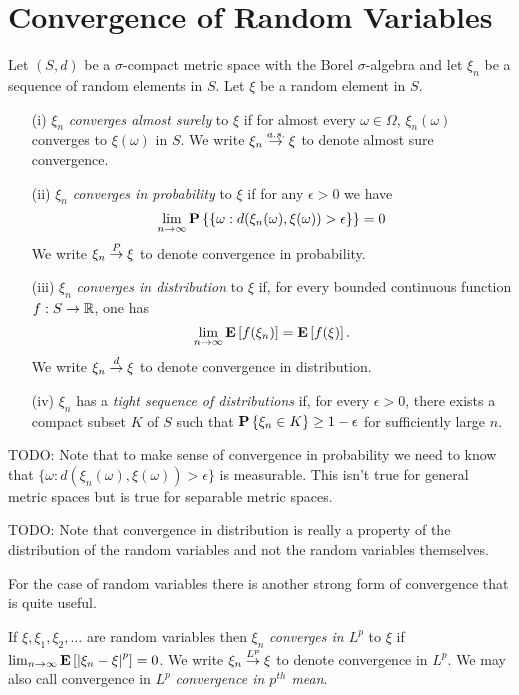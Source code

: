 \chapter{Convergence of Random Variables}
\begin{defn}Let $(S,d)$ be a $\sigma$-compact metric space with the Borel
  $\sigma$-algebra and let $\xi_n$ be a sequence of random elements in
  $S$.  Let $\xi$ be a random element in $S$.
\begin{itemize}
\item[(i)] $\xi_n$ \emph{converges almost surely} to $\xi$ if for almost
  every $\omega \in \Omega$, $\xi_n(\omega)$ converges to $\xi(\omega)$ in $S$.
We write $\xi_n \overset{a.s.}\to \xi$ to denote almost sure convergence.
\item[(ii)] $\xi_n$ \emph{converges in probability} to $\xi$ if for any
  $\epsilon>0$ we have 
\begin{equation*}
\lim_{n \to \infty} \textbf{P}\left \{ \lbrace \omega : d(\xi_n(\omega),
      \xi(\omega)) >
      \epsilon \rbrace  \right \} = 0
\end{equation*}
We write $\xi_n \overset{P}\to \xi$ to denote convergence in probability.
\item[(iii)] $\xi_n$ \emph{converges in distribution} to $\xi$ if, for
  every bounded continuous function $f:S \to \mathbb{R}$, one has 
\begin{equation*}
\lim_{n \to \infty} \textbf{E}\left[f(\xi_n)\right] = \textbf{E}\left[f(\xi)\right].
\end{equation*} 
We write $\xi_n \overset{d}\to \xi$ to denote convergence in distribution.
\item[(iv)] $\xi_n$ has a \emph{tight sequence of distributions} if, for
  every $\epsilon>0$, there exists a compact subset $K$ of $S$ such
  that $\textbf{P}\left \{\xi_n \in K \right \} \geq 1 - \epsilon$ for sufficiently
  large $n$.
\end{itemize}
\end{defn}

TODO: Note that to make sense of convergence in probability we need to know that $\lbrace \omega : d(\xi_n(\omega), \xi(\omega)) > \epsilon \rbrace$ 
is measurable.  This isn't true for general metric spaces but is true for separable metric spaces.

TODO: Note that convergence in distribution is really a property of
the distribution of the random variables and not the random variables
themselves.

For the case of random variables there is another strong form of
convergence that is quite useful.
\begin{defn}If $\xi, \xi_1, \xi_2, \dots$ are random variables then $\xi_n$ \emph{converges in $L^p$} to $\xi$ if 
$\lim_{n \to \infty} \textbf{E}\left[\left \vert \xi_n - \xi \right \vert^p\right] = 0$.
We write $\xi_n \overset{L^p}\to \xi$ to denote convergence in $L^p$.  We may
also call convergence in $L^p$ \emph{convergence in $p^{th}$ mean}.
\end{defn}

